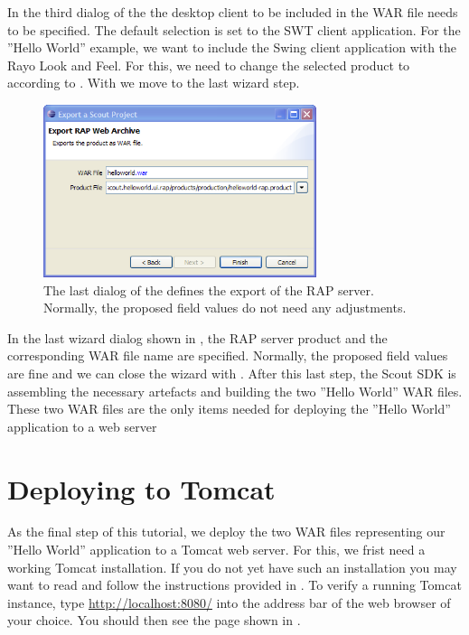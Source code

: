 \documentclass[a4paper,10pt,twoside]{book}
\begin{document}
In the third dialog of the  the desktop client to be included in the WAR file needs to be specified.
The default selection is set to the SWT client application.
For the ''Hello World'' example, we want to include the Swing client application with the Rayo Look and Feel.
For this, we need to change the selected product to  according to .
With  we move to the last wizard step.

\begin{figure}
\includegraphics[width=8cm]{export_wizard_4.png}
\caption{The last dialog of the  defines the export of the RAP server.
Normally, the proposed field values do not need any adjustments.}
\end{figure}

In the last wizard dialog shown in , the RAP server product and the corresponding WAR file name are specified.
Normally, the proposed field values are fine and we can close the wizard with .
After this last step, the Scout SDK is assembling the necessary artefacts and building the two ''Hello World'' WAR files.
These two WAR files are the only items needed for deploying the ''Hello World'' application to a web server

\section{Deploying to Tomcat}

As the final step of this tutorial, we deploy the two WAR files representing our ''Hello World'' application to a Tomcat web server.
For this, we frist need a working Tomcat installation.
If you do not yet have such an installation you may want to read and follow the instructions provided in .
To verify a running Tomcat instance, type \url{http://localhost:8080/} into the address bar of the web browser of your choice.
You should then see the page shown in .
\end{document}
